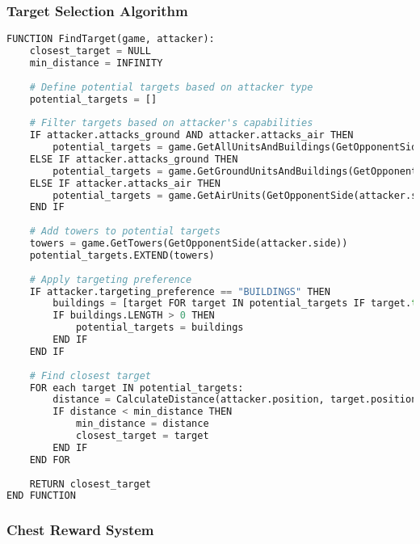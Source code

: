 \documentclass{article}
\begin{document}
\subsubsection{Target Selection Algorithm}

\begin{lstlisting}[language=Python, caption=Target Finding]
FUNCTION FindTarget(game, attacker):
    closest_target = NULL
    min_distance = INFINITY
    
    # Define potential targets based on attacker type
    potential_targets = []
    
    # Filter targets based on attacker's capabilities
    IF attacker.attacks_ground AND attacker.attacks_air THEN
        potential_targets = game.GetAllUnitsAndBuildings(GetOpponentSide(attacker.side))
    ELSE IF attacker.attacks_ground THEN
        potential_targets = game.GetGroundUnitsAndBuildings(GetOpponentSide(attacker.side))
    ELSE IF attacker.attacks_air THEN
        potential_targets = game.GetAirUnits(GetOpponentSide(attacker.side))
    END IF
    
    # Add towers to potential targets
    towers = game.GetTowers(GetOpponentSide(attacker.side))
    potential_targets.EXTEND(towers)
    
    # Apply targeting preference
    IF attacker.targeting_preference == "BUILDINGS" THEN
        buildings = [target FOR target IN potential_targets IF target.type == "BUILDING" OR target.type == "TOWER"]
        IF buildings.LENGTH > 0 THEN
            potential_targets = buildings
        END IF
    END IF
    
    # Find closest target
    FOR each target IN potential_targets:
        distance = CalculateDistance(attacker.position, target.position)
        IF distance < min_distance THEN
            min_distance = distance
            closest_target = target
        END IF
    END FOR
    
    RETURN closest_target
END FUNCTION
\end{lstlisting}

\subsubsection{Chest Reward System}
\end{document}

